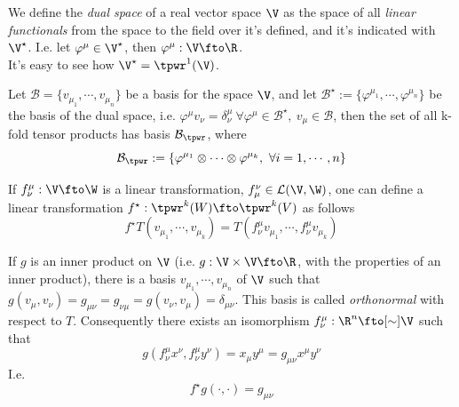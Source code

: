 \documentclass[../mmf.tex]{subfiles}
\begin{document}
\begin{dfn}
	We define the \textit{dual space} of a real vector space $\V$ as the space of all \textit{linear functionals} from the space to the field over it's defined, and it's indicated with $\V^{\star}$. I.e. let $\varphi^\mu\in\V^{\star}$, then $\varphi^\mu:\V\fto\R$.\\
	It's easy to see how $\V^{\star}=\tpwr^1(\V)$.
\end{dfn}
\begin{thm}
	Let $\mathcal{B}=\{v_{\mu_1},\cdots,v_{\mu_n}\}$ be a basis for the space $\V$, and let $\mathcal{B}^{\star}:=\{\varphi^{\mu_1},\cdots,\varphi^{\mu_n}\}$ be the basis of the dual space, i.e. $\varphi^\mu v_\nu=\delta^\mu_\nu\ \forall\varphi^\mu\in\mathcal{B}^\star,\ v_\mu\in\mathcal{B}$, then the set of all k-fold tensor products has basis $\mathcal{B}_\tpwr$, where
	\begin{equation}
		\mathcal{B}_\tpwr:=\{\varphi^{\mu_1}\otimes\cdots\otimes\varphi^{\mu_k},\ \forall i=1,\cdots,n\}
		\label{eq:tensorbasis}
	\end{equation}
\end{thm}
\begin{thm}
	If $f^\mu_\nu:\V\fto\W$ is a linear transformation, $f^\nu_\mu\in\mathcal{L}(\V,\W)$, one can define a linear transformation $f^\star:\tpwr^k(W)\fto\tpwr^k(V)$ as follows
	\begin{equation*}
		f^\star T(v_{\mu_1},\cdots,v_{\mu_k})=T(f^\mu_\nu v_{\mu_1},\cdots,f_\nu^\mu v_{\mu_k})
	\end{equation*}
\end{thm}
\begin{thm}
	If $g$ is an inner product on $\V$ (i.e. $g:\V\times\V\fto\R$, with the properties of an inner product), there is a basis $v_{\mu_1},\cdots,v_{\mu_n}$ of $\V$ such that $g(v_\mu,v_\nu)=g_{\mu\nu}=g_{\nu\mu}=g(v_\nu,v_\mu)=\delta_{\mu\nu}$. This basis is called \textit{orthonormal} with respect to $T$. Consequently there exists an isomorphism $f^\mu_\nu:\R^n\fto[\sim]\V$ such that
	\begin{equation}
		g(f^\mu_\nu x^\nu,f^\mu_\nu y^\nu)=x_\mu y^\mu=g_{\mu\nu}x^\mu y^\nu
	\end{equation}
	I.e.
	\begin{equation}
		f^\star g(\cdot,\cdot)=g_{\mu\nu}
	\end{equation}
\end{thm}
\end{document}

